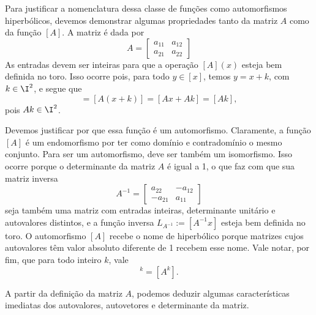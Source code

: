 Para justificar a nomenclatura dessa classe de funções como automorfismos hiperbólicos, devemos demonstrar algumas propriedades tanto da matriz $A$ como da função $[A]$. A matriz é dada por
	\begin{equation*}
	A = \begin{bmatrix}
		a_{11} & a_{12} \\
		a_{21} & a_{22}
		\end{bmatrix}
	\end{equation*}
As entradas devem ser inteiras para que a operação $[A](x)$ esteja bem definida no toro. Isso ocorre pois, para todo $y \in [x]$, temos $y = x + k$, com $k \in \I^2$, e segue que
	\begin{equation*}
	[Ay] = [A(x+k)] = [Ax + Ak] = [Ak],
	\end{equation*}
pois $Ak \in \I^2$.

Devemos justificar por que essa função é um automorfismo. Claramente, a função $[A]$ é um endomorfismo por ter como domínio e contradomínio o mesmo conjunto. Para ser um automorfismo, deve ser também um isomorfismo. Isso ocorre porque o determinante da matriz $A$ é igual a 1, o que faz com que sua matriz inversa
	\begin{equation*}
	A^{-1} = \begin{bmatrix}
		a_{22} & -a_{12} \\
		-a_{21} & a_{11}
		\end{bmatrix}
	\end{equation*}
seja também uma matriz com entradas inteiras, determinante unitário e autovalores distintos, e a função inversa $L_{A^{-1}} := [A^{-1}x]$ esteja bem definida no toro. O automorfismo $[A]$ recebe o nome de hiperbólico porque matrizes cujos autovalores têm valor absoluto diferente de 1 recebem esse nome. Vale notar, por fim, que para todo inteiro $k$, vale
	\begin{equation*}
	[A]^k = [A^k].
	\end{equation*}

A partir da definição da matriz $A$, podemos deduzir algumas características imediatas dos autovalores, autovetores e determinante da matriz.

